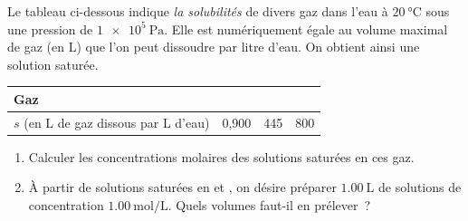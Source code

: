 Le tableau ci-dessous indique \emph{la solubilités} de divers gaz dans l'eau à
$\qty{20}{\degreeCelsius}$ sous une pression de $\qty{1e5}{\Pa}$. Elle est
numériquement égale au volume maximal de gaz (en \unit{\L}) que l'on peut
dissoudre par litre d'eau. On obtient ainsi une solution saturée.

\begin{minipage}{\linewidth}
    \begin{table}[H]
    \centering
    \setlength{\arrayrulewidth}{0.8pt}
    \renewcommand{\arraystretch}{1.5}
    \begin{tabularx}{\textwidth}{|p{6.5cm}|C|C|C|}
        \hline
        Gaz &  &  &  \\
        \hline
        $s$ (en \unit{\L} de gaz dissous par \unit{\L} d'eau) & 0,900 & 445 &
        800 \\
        \hline
    \end{tabularx}
\end{table}
\end{minipage}

\begin{enumerate}
    \item Calculer les concentrations molaires des solutions saturées en ces
          gaz.
    \item À partir de solutions saturées en  et , on désire
          préparer $\qty{1.00}{\L}$ de solutions de concentration
          $\qty{1.00}{\mol\per\L}$. Quels volumes faut-il en prélever~?
\end{enumerate}

